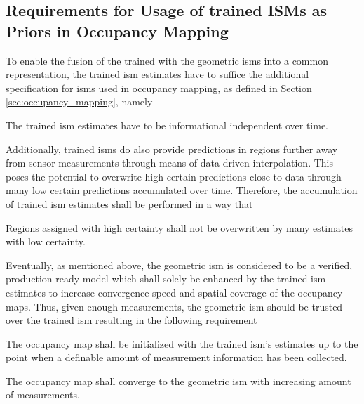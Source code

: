 \subsection{Requirements for Usage of trained ISMs as Priors in Occupancy Mapping}
\label{subsec:requirements_for_usage_of_deep_ims_as_priors_in_occmapping}
To enable the fusion of the trained with the geometric \gls{ism}s into a common representation, the trained \gls{ism} estimates have to suffice the additional specification for \gls{ism}s used in occupancy mapping, as defined in Section \ref{sec:occupancy_mapping}, namely
\\
\setcounter{req}{2}
\setcounter{subreq}{0}
\begin{subreq} \label{subreq:indep_info}
	The trained \gls{ism} estimates have to be informational independent over time.
\end{subreq}
Additionally, trained \gls{ism}s do also provide predictions in regions further away from sensor measurements through means of data-driven interpolation. This poses the potential to overwrite high certain predictions close to data through many low certain predictions accumulated over time. Therefore, the accumulation of trained \gls{ism} estimates shall be performed in a way that
\\
\begin{subreq} \label{subreq:no_falsification}
	Regions assigned with high certainty shall not be overwritten by many estimates with low certainty. 
\end{subreq}
Eventually, as mentioned above, the geometric \gls{ism} is considered to be a verified, production-ready model which shall solely be enhanced by the trained \gls{ism} estimates to increase convergence speed and spatial coverage of the occupancy maps. Thus, given enough measurements, the geometric \gls{ism} should be trusted over the trained \gls{ism} resulting in the following requirement
\\
\begin{subreq} \label{subreq:initialize_with_deep_ism}
	The occupancy map shall be initialized with the trained \gls{ism}'s estimates up to the point when a definable amount of measurement information has been collected.
\end{subreq}
\begin{subreq} \label{subreq:converge_to_geo_ism}
	The occupancy map shall converge to the geometric \gls{ism} with increasing amount of measurements.
\end{subreq}
%
